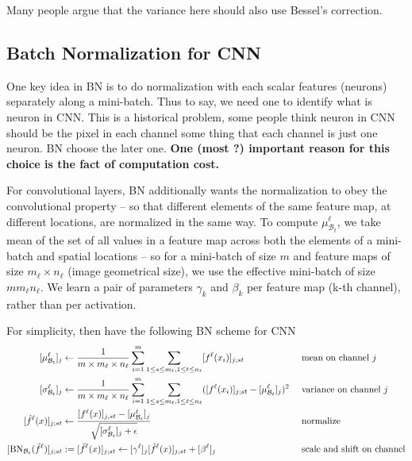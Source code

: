 Many people argue that the variance here should also use Bessel's correction.

\subsection{Batch Normalization for CNN}
One key idea in BN is to do normalization with each scalar features (neurons) 
separately along a mini-batch. 
Thus to say, we need one to identify what is neuron in CNN. 
This is a historical problem, some people think neuron in CNN
should be the pixel in each channel some thing that each channel is just 
one neuron. BN choose the later one. 
{\bf One (most ?) important reason for this choice is the fact of computation cost. }

For convolutional layers, BN additionally wants the normalization
to  obey the convolutional property -- so that different elements
of the same feature map, at different locations, are normalized in the
same way. 
To compute $\mu^\ell_{\mathcal B_t}$, we take mean of the set of all values in a feature map across both the
elements of a mini-batch and spatial locations -- so for a mini-batch
of size $m$ and feature maps of size $m_\ell \times n_\ell$ (image geometrical size), 
we use the effective mini-batch of size $ m m_\ell n_\ell$. 
We learn a pair of parameters $\gamma_k$ and $\beta_k$ per feature map (k-th channel), rather than per activation.


For simplicity, then have the following BN scheme for CNN
\begin{equation}\label{def:BNeq-traningCNN}
\begin{aligned}
[\mu^\ell_{\mathcal B_t}]_{j} & \leftarrow \frac{1}{m \times m_\ell \times n_\ell }\sum_{i=1}^m \sum_{1\le s\le m_\ell, 1\le t \le n_\ell} [f^\ell(x_i)]_{j;st} 
&&\text{ mean on channel }j \\
[\sigma^\ell_{\mathcal B_t}]_{j} & \leftarrow \frac{1}{m \times m_\ell \times n_\ell }\sum_{i=1}^m \sum_{1\le s\le m_\ell, 1\le t \le n_\ell}
([f^\ell(x_i)]_{j;st}-[\mu^\ell_{\mathcal B_t}]_j)^2   &&\text{ variance on channel }j\\
[\hat f^\ell (x)]_{j;st} & \leftarrow \frac{[f^\ell(x)]_{j,st}-[\mu^\ell_{\mathcal B_t}]_j}{\sqrt{[\sigma^\ell_{\mathcal B_t}]_j+\epsilon}}   &&\text{ normalize }\\
[{\rm BN}_{\mathcal B_t}(\tilde f^{\ell})]_{j;st} &:= [\tilde f^\ell(x)]_{j;st}  \leftarrow [\gamma^\ell]_j [\hat f^\ell (x)]_{j;st} + [\beta^\ell]_{j} 
&&\text{ scale and shift on channel}
\end{aligned}
\end{equation}
